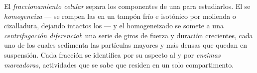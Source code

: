 \begin{definition}\label{def:b1:cell-unit-of-life:fractionation}
El \emph{fraccionamiento celular} separa los
componentes de una  para estudiarlos. El  se
\emph{homogeneiza} --- se rompen las  en un
tampón frío e isotónico por molienda o cizalladura, dejando intactos los
 --- y el homogeneizado se somete a una \emph{centrifugación
diferencial}: una serie de giros de fuerza
y duración crecientes, cada uno de los cuales sedimenta las partículas
mayores y más densas que quedan en suspensión. Cada fracción se identifica
por su aspecto al  y por
\emph{enzimas marcadoras}, actividades que se sabe
que residen en un solo compartimento.
\end{definition}


